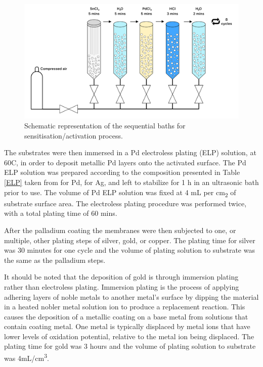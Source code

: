 \begin{figure}
    \includegraphics[width=\linewidth]{figures/pretreatment.png}
    \caption{Schematic representation of the sequential baths for sensitisation/activation process.}
    \label{sintering}
  \end{figure}

The substrates were then immersed in a Pd electroless plating (ELP) solution, at 60\textdegree C, in order to deposit metallic Pd layers onto the activated surface. The Pd ELP solution was prepared according to the composition presented in Table \ref{ELP} taken from \cite{GouveiaGil2015} for Pd, \cite{Braun2014} for Ag, \cite{Pomerantz2009}  and left to stabilize for 1 h in an ultrasonic bath prior to use. The volume of Pd ELP solution was fixed at 4 mL per cm\textsubscript{2} of 
substrate surface area. The electroless plating procedure was performed twice, with a total plating time of 60 mins.

After the palladium coating the membranes were then subjected to one, or multiple, other plating steps of silver, gold, or copper. The plating time for silver was 30 minutes for one cycle and the volume of plating solution to substrate was the same as the palladium steps.

It should be noted that the deposition of gold is through immersion plating rather than electroless plating. \cite{adawiyah_azlina_fadil_aisha_hanim_2016} Immersion plating is the process of applying adhering layers of noble metals to another metal's surface by dipping the material in a heated nobler metal solution ion to produce a replacement reaction. This causes the deposition of a metallic coating on a base metal from solutions that contain coating metal. One metal is typically displaced by metal ions that have lower levels of oxidation potential, relative to the metal ion being displaced. The plating time for gold was 3 hours and the volume of plating solution to substrate was 4mL/cm\textsuperscript{3}. 

